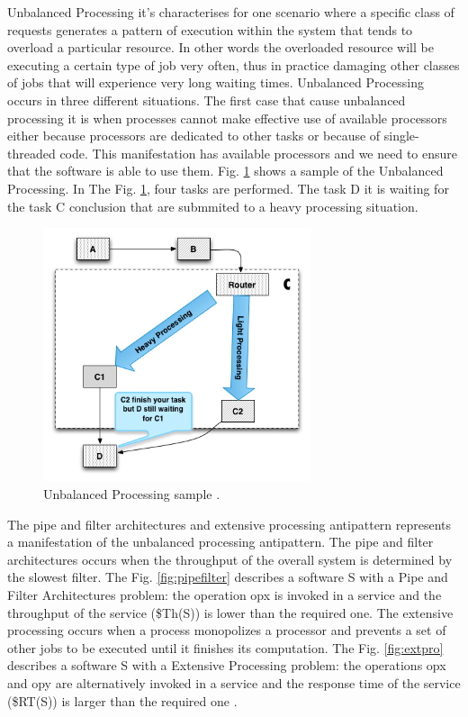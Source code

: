 \documentclass{report}
\begin{document}
Unbalanced Processing it's characterises for one scenario where a specific class of requests generates a pattern of execution within the system that tends to overload a particular resource. In other words the overloaded resource will be executing a certain type of job very often, thus in practice damaging other classes
of jobs that will experience very long waiting times. Unbalanced Processing occurs in three different situations. The first case that cause unbalanced processing it is when processes cannot make effective use of available processors either because processors are dedicated to other tasks or because of single-threaded code. This manifestation has available processors and we need to ensure that the software is able to use them. Fig. \ref{fig:unbalanced}  shows a sample of the Unbalanced Processing. In The Fig. \ref{fig:unbalanced}, four tasks are performed. The task D it is waiting for the task C conclusion that are submmited to a heavy processing situation.

\begin{figure}[h]
\centering
\includegraphics[width=0.7\textwidth]{./images/unbalanced.png}
\caption{Unbalanced Processing sample \cite{Wert2013a}. }
\label{fig:unbalanced}
\end{figure}

The pipe and filter architectures  and extensive processing antipattern represents a manifestation of the unbalanced processing antipattern. The pipe and filter architectures occurs when the throughput of the overall system is determined by the slowest filter. The  Fig. \ref{fig:pipefilter} describes a software S with a Pipe and Filter Architectures problem:  the operation opx is invoked in a service  and the throughput of the service (\$Th(S)) is lower than the required one. The extensive processing occurs when a process monopolizes a processor and prevents a set of other jobs to be executed until it finishes its computation. The Fig. \ref{fig:extpro} describes a software S with a Extensive Processing problem: the operations opx and opy are alternatively invoked in a service and the response time of the service (\$RT(S)) is larger than the required one \cite{Vetoio2011}.
\end{document}
